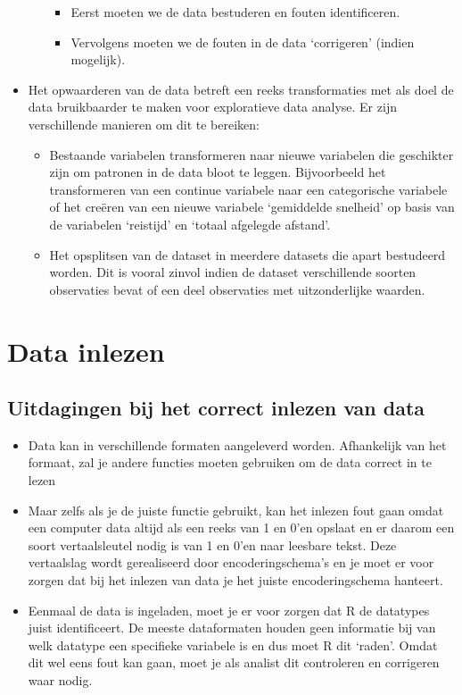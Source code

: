 \documentclass[]{memoir}
\providecommand{\tightlist}{%
  \setlength{\itemsep}{0pt}\setlength{\parskip}{0pt}}
\begin{document}
\begin{itemize}
\begin{itemize}
    \begin{itemize}
    \tightlist
    \item
      Eerst moeten we de data bestuderen en fouten identificeren.
    \item
      Vervolgens moeten we de fouten in de data `corrigeren' (indien
      mogelijk).
    \end{itemize}
  \end{itemize}
\item
  Het opwaarderen van de data betreft een reeks transformaties met als
  doel de data bruikbaarder te maken voor exploratieve data analyse. Er
  zijn verschillende manieren om dit te bereiken:

  \begin{itemize}
  \tightlist
  \item
    Bestaande variabelen transformeren naar nieuwe variabelen die
    geschikter zijn om patronen in de data bloot te leggen. Bijvoorbeeld
    het transformeren van een continue variabele naar een categorische
    variabele of het creëren van een nieuwe variabele `gemiddelde
    snelheid' op basis van de variabelen `reistijd' en `totaal afgelegde
    afstand'.
  \item
    Het opsplitsen van de dataset in meerdere datasets die apart
    bestudeerd worden. Dit is vooral zinvol indien de dataset
    verschillende soorten observaties bevat of een deel observaties met
    uitzonderlijke waarden.
  \end{itemize}
\end{itemize}

\section{Data inlezen}\label{data-inlezen}

\subsection{Uitdagingen bij het correct inlezen van
data}\label{uitdagingen-bij-het-correct-inlezen-van-data}

\begin{itemize}
\tightlist
\item
  Data kan in verschillende formaten aangeleverd worden. Afhankelijk van
  het formaat, zal je andere functies moeten gebruiken om de data
  correct in te lezen
\item
  Maar zelfs als je de juiste functie gebruikt, kan het inlezen fout
  gaan omdat een computer data altijd als een reeks van 1 en 0'en
  opslaat en er daarom een soort vertaalsleutel nodig is van 1 en 0'en
  naar leesbare tekst. Deze vertaalslag wordt gerealiseerd door
  encoderingschema's en je moet er voor zorgen dat bij het inlezen van
  data je het juiste encoderingschema hanteert.
\item
  Eenmaal de data is ingeladen, moet je er voor zorgen dat R de
  datatypes juist identificeert. De meeste dataformaten houden geen
  informatie bij van welk datatype een specifieke variabele is en dus
  moet R dit `raden'. Omdat dit wel eens fout kan gaan, moet je als
  analist dit controleren en corrigeren waar nodig.
\end{itemize}
\end{document}
